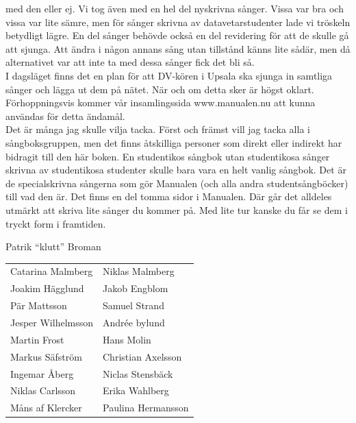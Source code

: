 \documentclass[a6paper,fontsize=10pt,twoside,open=right]{scrbook}
\begin{document}
med den eller ej. Vi tog även med en hel del nyskrivna sånger. Vissa
var bra och vissa var lite sämre, men för sånger skrivna av
datavetarstudenter lade vi tröskeln betydligt lägre. En del sånger
behövde också en del revidering för att de skulle gå att sjunga. Att
ändra i någon annans sång utan tillstånd känns lite sådär, men då
alternativet var att inte ta med dessa sånger fick det bli så.\\
\hspace*{10pt}I dagsläget finns det en plan för att DV-kören i Upsala
ska sjunga in samtliga sånger och lägga ut dem på nätet. När och om
detta sker är högst oklart. Förhoppningsvis kommer vår insamlingssida
www.manualen.nu att kunna användas för detta ändamål.\\
\hspace*{10pt}Det är många jag skulle vilja tacka. Först och främst
vill jag tacka alla i sångboksgruppen, men det finns åtskilliga
personer som direkt eller indirekt har bidragit till den här boken. En
studentikos sångbok utan studentikosa sånger skrivna av studentikosa
studenter skulle bara vara en helt vanlig sångbok. Det är de
specialskrivna sångerna som gör Manualen (och alla andra
studentsångböcker) till vad den är. Det finns en del tomma sidor i
Manualen. Där går det alldeles utmärkt att skriva lite sånger du
kommer på. Med lite tur kanske du får se dem i tryckt form i
framtiden.\par
\vspace{10pt}
\noindent Patrik ``klutt'' Broman
\par
\noindent
\begin{tabular}{@{}p{}p{}@{}}
  Catarina Malmberg & Niklas Malmberg\\
  Joakim Hägglund & Jakob Engblom\\
  Pär Mattsson & Samuel Strand\\
  Jesper Wilhelmsson & Andrée bylund\\
  Martin Frost & Hans Molin\\
  Markus Säfström & Christian Axelsson\\
  Ingemar Åberg & Niclas Stensbäck\\
  Niklas Carlsson & Erika Wahlberg\\
  Måns af Klercker & Paulina Hermansson
\end{tabular}\par
\end{document}
